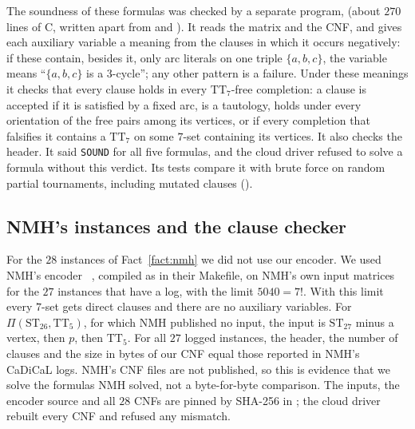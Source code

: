 \documentclass[11pt]{amsart}
\theoremstyle{definition}
\theoremstyle{remark}
\newcommand{\TT}[1]{\mathrm{TT}_{#1}}
\newcommand{\ST}[1]{\mathrm{ST}_{#1}}
\newcommand{\Piv}[2]{\Pi(#1,#2)}
\begin{document}
The soundness of these formulas was checked by a separate program,
 (about $270$ lines of C, written apart from
 and ). It reads the matrix and the
CNF, and gives each auxiliary variable a meaning from the clauses in which it
occurs negatively: if these contain, besides it, only arc literals on one
triple $\{a,b,c\}$, the variable means ``$\{a,b,c\}$ is a $3$-cycle''; any
other pattern is a failure. Under these meanings it checks that every clause
holds in every $\TT{7}$-free completion: a clause is accepted if it is
satisfied by a fixed arc, is a tautology, holds under every orientation of
the free pairs among its vertices, or if every completion that falsifies it
contains a $\TT{7}$ on some $7$-set containing its vertices. It also checks
the header. It said \texttt{SOUND} for all five formulas, and the cloud
driver refused to solve a formula without this verdict. Its tests compare it
with brute force on random partial tournaments, including mutated clauses
().

\subsection{NMH's instances and the clause checker}\label{sec:stage4enc}
For the $28$ instances of Fact~\ref{fact:nmh} we did not use our encoder. We
used NMH's encoder ~\cite{NMHrepo}, compiled as in
their Makefile, on NMH's own input matrices for the $27$ instances that have a
log, with the limit $5040 = 7!$. With this limit every $7$-set gets direct
clauses and there are no auxiliary variables. For $\Piv{\ST{26}}{\TT{5}}$,
for which NMH published no input, the input is $\ST{27}$ minus a vertex, then
$p$, then $\TT{5}$. For all $27$ logged instances, the header, the number of
clauses and the size in bytes of our CNF equal those reported in NMH's
CaDiCaL logs. NMH's CNF files are not published, so this is evidence that we
solve the formulas NMH solved, not a byte-for-byte comparison. The inputs, the
encoder source and all $28$ CNFs are pinned by SHA-256 in
; the cloud driver rebuilt every CNF and
refused any mismatch.
\end{document}
